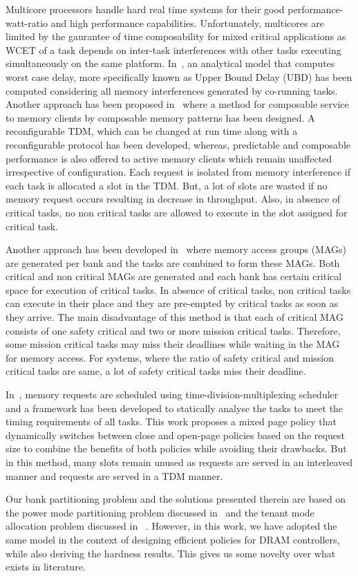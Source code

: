 \noindent
Multicore processors handle hard real time systems for their good performance-watt-ratio and high performance capabilities.
Unfortunately, multicores are limited by the gaurantee of time composability for mixed critical applications as WCET of a task 
depends on inter-task interferences with other tasks executing simultaneously on the same platform. 
In~\cite{paolieri2013timing}, an analytical model that computes worst case delay, more specifically known as Upper Bound 
Delay (UBD) has been computed considering all memory interferences generated by co-running tasks. Another approach has been 
proposed in~\cite{goossens2013reconfigurable} where a method for composable service to memory clients by composable memory 
patterns has been designed. A reconfigurable TDM, which can be changed at run time along with a reconfigurable protocol has 
been developed, whereas, predictable and composable performance is also offered to active memory clients which remain 
unaffected irrespective of configuration. Each request is isolated from memory interference if each task is allocated 
a slot in the TDM. But, a lot of slots are wasted if no memory request occurs resulting in decrease in throughput. Also, in 
absence of critical tasks, no non critical tasks are allowed to execute in the slot assigned for critical task.

\noindent
Another approach has been developed in~\cite{kim2015predictable} where memory access groups (MAGs) are generated per bank 
and the tasks are combined to form these MAGs. Both critical and non critical MAGs are generated and each bank has certain 
critical space for execution of critical tasks. In absence of critical tasks, non critical tasks can execute in their place 
and they are pre-empted by critical tasks as soon as they arrive. The main disadvantage of this method is that each 
of critical MAG consists of one safety critical and two or more mission critical tasks. Therefore, some mission critical 
tasks may miss their deadlines while waiting in the MAG for memory access. For systems, where the ratio of safety 
critical and mission critical tasks are same, a lot of safety critical tasks miss their deadline. 

\noindent
In~\cite{hassan2017predictable}, memory requests are scheduled using time-division-multiplexing scheduler and a framework 
has been developed to statically analyse the tasks to meet the timing requirements of all tasks. This work proposes a
mixed page policy that dynamically switches between close and open-page policies based on the request size to combine the 
benefits of both policies while avoiding their drawbacks. But in this method, many slots remain unused as requests are 
served in an interleaved manner and requests are served in a TDM manner.

\noindent
Our bank partitioning problem and the solutions presented therein are based on the power mode partitioning problem discussed 
in~\cite{DBLP:conf/vlsid/RayDC07} and the tenant mode allocation problem discussed 
in ~\cite{DBLP:conf/im/NandiBGB13, DBLP:journals/soca/NandiGBB17}. However, in this work, we have adopted the same model in 
the context of designing efficient policies for DRAM controllers, while also deriving the hardness results. This gives us 
some novelty over what exists in literature.
